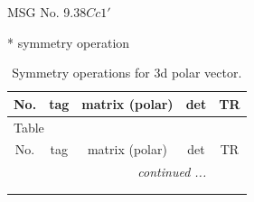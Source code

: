 \documentclass[fleqn,8pt]{jsarticle}
\begin{document}
\setcounter{MaxMatrixCols}{32}

\renewcommand{\tablename}{Table~}
\renewcommand{\figurename}{Figure~}
\begin{center}
\LARGE
MSG No. 9.38\quad$Cc1'$
\end{center}
* symmetry operation
\renewcommand{\arraystretch}{1.3}
\begin{longtable}{ccccc}
\caption{Symmetry operations for 3d polar vector.}
 \\
 \hline \hline
No. & tag & matrix (polar) & det & TR \\ \hline \endfirsthead

\multicolumn{4}{l}{\tablename\ \thetable{}} \\
 \hline \hline
No. & tag & matrix (polar) & det & TR \\ \hline \endhead

 \hline \hline
\multicolumn{4}{r}{\footnotesize\it continued ...} \\ \endfoot

 \hline \hline
\multicolumn{4}{r}{} \\ \endlastfoot


\end{longtable}
\end{document}
